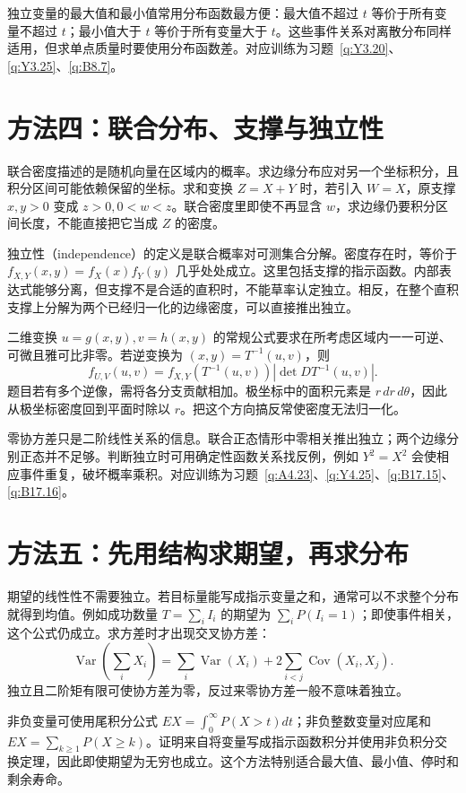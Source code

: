 \documentclass[12pt,fontset=fandol]{ctexart}
\begin{document}
独立变量的最大值和最小值常用分布函数最方便：最大值不超过 $t$ 等价于所有变量不超过 $t$；最小值大于 $t$ 等价于所有变量大于 $t$。这些事件关系对离散分布同样适用，但求单点质量时要使用分布函数差。对应训练为习题~\ref{q:Y3.20}、\ref{q:Y3.25}、\ref{q:B8.7}。

\section*{方法四：联合分布、支撑与独立性}
联合密度描述的是随机向量在区域内的概率。求边缘分布应对另一个坐标积分，且积分区间可能依赖保留的坐标。求和变换 $Z=X+Y$ 时，若引入 $W=X$，原支撑 $x,y>0$ 变成 $z>0,0<w<z$。联合密度里即使不再显含 $w$，求边缘仍要积分区间长度，不能直接把它当成 $Z$ 的密度。

独立性（independence）的定义是联合概率对可测集合分解。密度存在时，等价于 $f_{X,Y}(x,y)=f_X(x)f_Y(y)$ 几乎处处成立。这里包括支撑的指示函数。内部表达式能够分离，但支撑不是合适的直积时，不能草率认定独立。相反，在整个直积支撑上分解为两个已经归一化的边缘密度，可以直接推出独立。

二维变换 $u=g(x,y),v=h(x,y)$ 的常规公式要求在所考虑区域内一一可逆、可微且雅可比非零。若逆变换为 $(x,y)=T^{-1}(u,v)$，则
\[
f_{U,V}(u,v)=f_{X,Y}(T^{-1}(u,v))\left|\det D T^{-1}(u,v)\right|.
\]
题目若有多个逆像，需将各分支贡献相加。极坐标中的面积元素是 $r\,dr\,d\theta$，因此从极坐标密度回到平面时除以 $r$。把这个方向搞反常使密度无法归一化。

零协方差只是二阶线性关系的信息。联合正态情形中零相关推出独立；两个边缘分别正态并不足够。判断独立时可用确定性函数关系找反例，例如 $Y^2=X^2$ 会使相应事件重复，破坏概率乘积。对应训练为习题~\ref{q:A4.23}、\ref{q:Y4.25}、\ref{q:B17.15}、\ref{q:B17.16}。

\section*{方法五：先用结构求期望，再求分布}
期望的线性性不需要独立。若目标量能写成指示变量之和，通常可以不求整个分布就得到均值。例如成功数量 $T=\sum_iI_i$ 的期望为 $\sum_iP(I_i=1)$；即使事件相关，这个公式仍成立。求方差时才出现交叉协方差：
\[
\operatorname{Var}\left(\sum_iX_i\right)=\sum_i\operatorname{Var}(X_i)+2\sum_{i<j}\operatorname{Cov}(X_i,X_j).
\]
独立且二阶矩有限可使协方差为零，反过来零协方差一般不意味着独立。

非负变量可使用尾积分公式 $EX=\int_0^\infty P(X>t)dt$；非负整数变量对应尾和 $EX=\sum_{k\ge1}P(X\ge k)$。证明来自将变量写成指示函数积分并使用非负积分交换定理，因此即使期望为无穷也成立。这个方法特别适合最大值、最小值、停时和剩余寿命。
\end{document}
